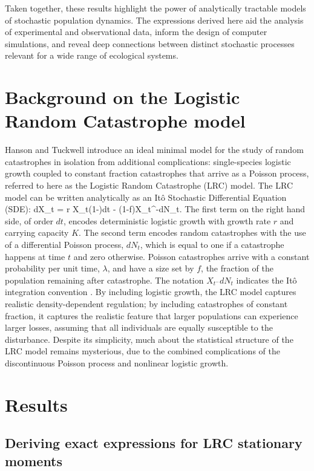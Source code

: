Taken together, these results highlight the power of analytically tractable models of stochastic population dynamics.  The expressions derived here aid the analysis of experimental and observational data, inform the design of computer simulations, and reveal deep connections between distinct stochastic processes relevant for a wide range of ecological systems.


\section{Background on the Logistic Random Catastrophe model}

Hanson and Tuckwell \cite{hanson1981} introduce an ideal minimal model for the study of random catastrophes in isolation from additional complications: single-species logistic growth coupled to constant fraction catastrophes that arrive as a Poisson process, referred to here as the Logistic Random Catastrophe (LRC) model.  The LRC model can be written analytically as an It\^{o} Stochastic Differential Equation (SDE):
\be
dX_t = r X_t\left(1-\right)dt  - (1-f)X_{t^-}dN_t.
\ee
\noindent The first term on the right hand side, of order $dt$, encodes deterministic logistic growth with growth rate $r$ and carrying capacity $K$.  The second term encodes random catastrophes with the use of a differential Poisson process, $dN_t$, which is equal to one if a catastrophe happens at time $t$ and zero otherwise.  Poisson catastrophes arrive with a constant probability per unit time, $\lambda$, and have a size set by $f$, the fraction of the population remaining after catastrophe.  The notation $X  _{t^-}dN_t$ indicates the It\^{o} integration convention \cite{hansonBook}.  By including logistic growth, the LRC model captures realistic density-dependent regulation; by including catastrophes of constant fraction, it captures the realistic feature that larger populations can experience larger losses, assuming that all individuals are equally susceptible to the disturbance.  Despite its simplicity, much about the statistical structure of the LRC model remains mysterious, due to the combined complications of the discontinuous Poisson process and nonlinear logistic growth.

\section{Results}
\subsection{Deriving exact expressions for LRC stationary moments}

